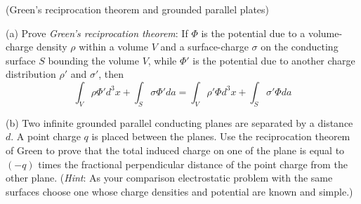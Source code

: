 \documentclass[12pt]{article}
\begin{document}
\begin{problem}[Problem 1.4]{(Green's reciprocation theorem and grounded
    parallel plates)}

(a) Prove \textit{Green's reciprocation theorem}: If $\Phi$ is the potential due
to a volume-charge density $\rho$ within a volume $V$ and a surface-charge
$\sigma$ on the conducting surface $S$ bounding the volume $V$, while $\Phi'$ is
the potential due to another charge distribution $\rho'$ and $\sigma'$, then
\begin{equation}
    \int_V\rho\Phi'd^3x+\int_S\sigma\Phi' da=\int_V\rho'\Phi
    d^3x+\int_S\sigma'\Phi da 
\end{equation}


(b) Two infinite grounded parallel conducting planes are separated by a distance
$d$. A point charge $q$ is placed between the planes. Use the reciprocation
theorem of Green to prove that the total induced charge on one of the plane is
equal to $(-q)$ times the fractional perpendicular distance of the point charge
from the other plane. (\textit{Hint}: As your comparison electrostatic problem
with the same surfaces choose one whose charge densities and potential are known
and simple.)
    
\end{problem}
    
\end{document}
